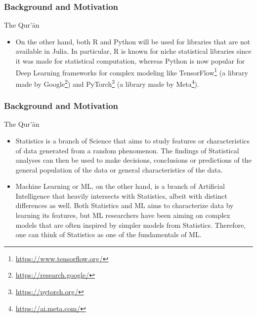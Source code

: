 \documentclass{beamer}
\theoremstyle{definition}
\begin{document}
\begin{frame}[t, fragile]\justifying
\frametitle{Background and Motivation}
\begin{block}{The Qur'\=an}
\begin{itemize}\justifying    
\item On the other hand, both R and Python will be used for libraries that are not available in Julia. In particular, R is known for niche statistical libraries since it was made for statistical computation, whereas Python is now popular for Deep Learning frameworks for complex modeling like TensorFlow\footnote{\url{https://www.tensorflow.org/}} (a library made by Google\footnote{\url{https://research.google/}}) and PyTorch\footnote{\url{https://pytorch.org/}} (a library made by Meta\footnote{\url{https://ai.meta.com/}}). 
\end{itemize}
\end{block}
\end{frame}


\begin{frame}[t, fragile]\justifying
\frametitle{Background and Motivation}
\begin{block}{The Qur'\=an}
\begin{itemize}\justifying    
\item Statistics is a branch of Science that aims to study features or characteristics of data generated from a random phenomenon. The findings of Statistical analyses can then be used to make decisions, conclusions or predictions of the general population of the data or general characteristics of the data. \pause
\item Machine Learning or ML, on the other hand, is a branch of Artificial Intelligence that heavily intersects with Statistics, albeit with distinct differences as well. Both Statistics and ML aims to characterize data by learning its features, but ML researchers have been aiming on complex models that are often inspired by simpler models from Statistics. Therefore, one can think of Statistics as one of the fundamentals of ML. 
\end{itemize}
\end{block}
\end{frame}
\end{document}

